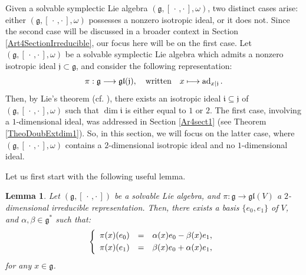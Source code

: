 \documentclass[final,1p,times,nopreprintline]{elsarticle}
\newtheorem{lemma}{Lemma}[section]
\theoremstyle{definition}
\numberwithin{equation}{section}
\newcommand{\w}{\omega}
\newcommand{\g}{\mathfrak{g}}
\newcommand{\ad}{\operatorname{ad}}
\numberwithin{equation}{section}
\newcommand{\ii}{\mathfrak{i}}
\newcommand{\gl}{\mathfrak{gl}}
\newcommand{\cro}{[\,\cdot\,,\cdot\,]}
\newcommand{\jj}{\mathfrak{j}}
\begin{document}
Given a solvable symplectic Lie algebra $(\g,[\,\cdot\,,\cdot\,],\w)$, two distinct cases arise: either $(\g,[\,\cdot\,,\cdot\,],\w)$ possesses a nonzero isotropic ideal, or it does not. Since the second case will be discussed in a broader context in Section \ref{Art4SectionIrreducible}, our focus here will be on the first case. Let $(\g,[\,\cdot\,,\cdot\,],\w)$ be a solvable symplectic Lie algebra which admits a nonzero isotropic ideal $\jj\subset\g$, and consider the following representation:
\begin{equation*}
\pi:\g\longrightarrow\gl(\jj),\quad\textnormal{written}\quad x\longmapsto\ad_{x|\jj}.
\end{equation*}
Then, by Lie's theorem (cf. \cite[p. 46]{Bour}), there exists an isotropic ideal $\ii\subseteq\jj$ of $(\g,\cro,\w)$ such that $\dim\ii$ is either equal to $1$ or $2$. The first case, involving a $1$-dimensional ideal, was addressed in Section \ref{Ar4sect1} (see Theorem \ref{TheoDoubExtdim1}). So, in this section, we will focus on the latter case, where $(\g,\cro,\w)$ contains a $2$-dimensional isotropic ideal and no $1$-dimensional ideal.\vspace{2mm}

Let us first start with the following useful lemma.

\begin{lemma}\label{LemSolIrrDim2}
	Let $(\g,\cro)$ be a solvable Lie algebra, and $\pi:\g\to\gl(V)$ a $2$-dimensional irreducible representation. Then, there exists a basis $\{e_0,e_1\}$ of $V$, and $\alpha,\beta\in\g^*$ such that:
	\begin{equation}\label{idealsol2}
		\left\{
		\begin{array}{r c l}\vspace{1mm}
			\pi(x)(e_0)&=&\alpha(x)e_0-\beta(x)e_1,\\ 
			\pi(x)(e_1)&=&\beta(x)e_0+\alpha(x)e_1,
		\end{array}
		\right.\\
	\end{equation}
	for any $x\in\g$.
\end{lemma}
\end{document}
